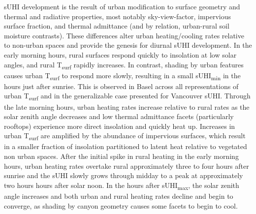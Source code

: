 \begin{bibunit}
sUHI development is the result of urban modification to surface geometry and thermal and radiative properties, most notably sky-view-factor, impervious surface fraction, and thermal admittance (and by relation, urban-rural soil moisture contrasts). These differences alter urban heating/cooling rates relative to non-urban spaces and provide the genesis for diurnal sUHI development. In the early morning hours, rural surfaces respond quickly to insolation at low solar angles, and rural T\textsubscript{surf} rapidly increases. In contrast, shading by urban features causes urban T\textsubscript{surf} to respond more slowly, resulting in a small sUHI\textsubscript{min} in the hours just after sunrise. This is observed in Basel across all representations of urban T\textsubscript{surf} and in the generalizable case presented for Vancouver sUHI. Through the late morning hours, urban heating rates increase relative to rural rates as the solar zenith angle decreases and low thermal admittance facets (particularly rooftops) experience more direct insolation and quickly heat up. Increases in urban T\textsubscript{surf} are amplified by the abundance of impervious surfaces, which result in a smaller fraction of insolation partitioned to latent heat relative to vegetated non urban spaces. After the initial spike in rural heating in the early morning hours, urban heating rates overtake rural approximately three to four hours after sunrise and the sUHI slowly grows through midday to a peak at approximately two hours hours after solar noon. In the hours after sUHI\textsubscript{max}, the solar zenith angle increases and both urban and rural heating rates decline and begin to converge, as shading by canyon geometry causes some facets to begin to cool.


\end{bibunit}
